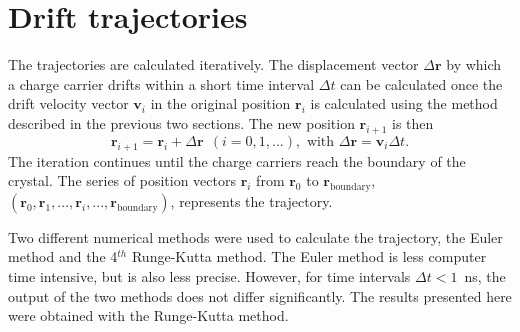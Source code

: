  
\section{Drift trajectories } 
\label{sec:pss:trj} 
The trajectories are calculated iteratively.  The displacement vector
$\Delta \mathbf{r}$ by which a charge carrier drifts within a short
time interval $\Delta t$ can be calculated once the drift velocity
vector $\mathbf{v}_{i}$ in the original position $\mathbf{r}_{i}$ is
calculated using the method described in the previous two sections.
The new position $\mathbf{r}_{i+1}$ is then
\begin{equation} 
\label{eq:pss:pos} 
\mathbf{r}_{i+1} = \mathbf{r}_{i} + \Delta \mathbf{r} \ \ 
(i=0,1,...), \text{ with } 
\Delta \mathbf{r} = \mathbf{v}_{i} \Delta t. 
\end{equation} 
The iteration continues until the charge carriers reach the boundary
of the crystal. The series of position vectors $\mathbf{r}_{i}$ from
$\mathbf{r}_{0}$ to $\mathbf{r}_{\text{boundary}}$, $(\mathbf{r}_{0},
\mathbf{r}_{1}, ..., \mathbf{r}_{i}, ...,
\mathbf{r}_{\text{boundary}})$, represents the trajectory.
 
Two different numerical methods were used to calculate the trajectory,
the Euler method and the 4$^{th}$ Runge-Kutta method.  The Euler
method is less computer time intensive, but is also less precise.
However, for time intervals $\Delta t < 1$~ns, the output of the two
methods does not differ significantly.  The results presented here
were obtained with the Runge-Kutta method.
 
